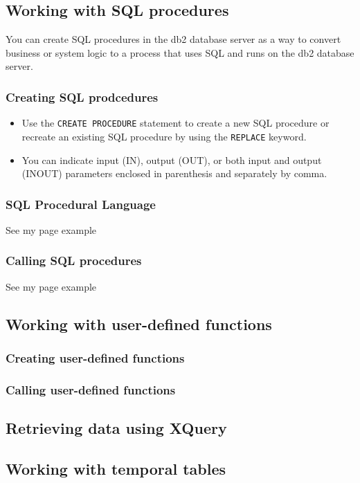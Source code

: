 \documentclass{article}
\begin{document}
\subsection{Working with SQL procedures}
You can create SQL procedures in the db2 database server as a way to convert business or system
logic to a process that uses SQL and runs on the db2 database server.
\subsubsection{Creating SQL prodcedures}
\begin{itemize}
\item Use the \texttt{CREATE PROCEDURE} statement to create a new SQL procedure or recreate an existing
SQL procedure by using the \texttt{REPLACE} keyword.
\item You can indicate input (IN), output (OUT), or both input and output (INOUT) parameters enclosed
in parenthesis and separately by comma.
\end{itemize}
\subsubsection{SQL Procedural Language}
See my page example
\subsubsection{Calling SQL procedures}
See my page example

\subsection{Working with user-defined functions}
\subsubsection{Creating user-defined functions}
\subsubsection{Calling user-defined functions}

\subsection{Retrieving data using XQuery}

\subsection{Working with temporal tables}

%
%
\end{document}
